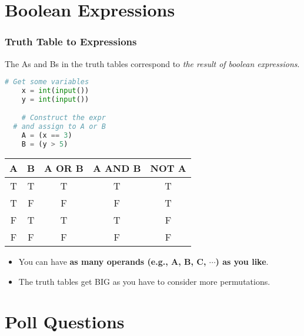 \documentclass{beamer}
\begin{document}
\section{Boolean Expressions}

%
%
\begin{frame}[fragile]
	\frametitle{Truth Table to Expressions}
	\vfill
	The As and Bs in the truth tables correspond to \textit{the result of boolean expressions}.
	\vfill
	\begin{minipage}{0.4\textwidth}
		\begin{lstlisting}[language=Python,autogobble]
	# Get some variables 
	x = int(input())
	y = int(input())

	# Construct the expr
  # and assign to A or B
	A = (x == 3)
	B = (y > 5)
		\end{lstlisting}
	\end{minipage}
	\begin{minipage}{0.59\textwidth}
		\begin{table}[]
			\begin{tabular}{|cc|c|c|c|}
				{\color[HTML]{CD9934} \textbf{A}} & {\color[HTML]{3531FF} \textbf{B}} & \textbf{A OR B} & \textbf{A AND B} & \textbf{NOT A} \\ \hline
				{\color[HTML]{CD9934} T}          & {\color[HTML]{3531FF} T}          & T               & T                & T              \\
				{\color[HTML]{CD9934} T}          & {\color[HTML]{3531FF} F}          & F               & F                & T              \\
				{\color[HTML]{CD9934} F}          & {\color[HTML]{3531FF} T}          & T               & T                & F              \\
				{\color[HTML]{CD9934} F}          & {\color[HTML]{3531FF} F}          & F               & F                & F             
			\end{tabular}
		\end{table}
	\end{minipage}
	\vfill
	\pause
	\begin{itemize}
		\item You can have \textbf{as many operands (e.g., A, B, C, $\cdots$) as you like}.
		\item The truth tables get BIG as you have to consider more permutations.
	\end{itemize}
\end{frame}

\section{Poll Questions}
\end{document}
